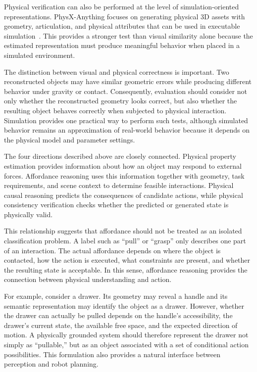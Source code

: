 \documentclass{SCIS2026}
\begin{document}
Physical verification can also be performed at the level of
simulation-oriented representations. PhysX-Anything focuses on generating
physical 3D assets with geometry, articulation, and physical attributes that
can be used in executable simulation~\cite{cao2025physxanything}. This
provides a stronger test than visual similarity alone because the estimated
representation must produce meaningful behavior when placed in a simulated
environment.

The distinction between visual and physical correctness is important. Two
reconstructed objects may have similar geometric errors while producing
different behavior under gravity or contact. Consequently, evaluation
should consider not only whether the reconstructed geometry looks correct,
but also whether the resulting object behaves correctly when subjected to
physical interaction. Simulation provides one practical way to perform such
tests, although simulated behavior remains an approximation of real-world
behavior because it depends on the physical model and parameter settings.



The four directions described above are closely connected. Physical property
estimation provides information about how an object may respond to external
forces. Affordance reasoning uses this information together with geometry,
task requirements, and scene context to determine feasible interactions.
Physical causal reasoning predicts the consequences of candidate actions,
while physical consistency verification checks whether the predicted or
generated state is physically valid.

This relationship suggests that affordance should not be treated as an
isolated classification problem. A label such as ``pull'' or ``grasp'' only
describes one part of an interaction. The actual affordance depends on where
the object is contacted, how the action is executed, what constraints are
present, and whether the resulting state is acceptable. In this sense,
affordance reasoning provides the connection between physical understanding
and action.

For example, consider a drawer. Its geometry may reveal a handle and its
semantic representation may identify the object as a drawer. However,
whether the drawer can actually be pulled depends on the handle's
accessibility, the drawer's current state, the available free space, and the
expected direction of motion. A physically grounded system should therefore
represent the drawer not simply as ``pullable,'' but as an object associated
with a set of conditional action possibilities. This formulation also
provides a natural interface between perception and robot planning.
\end{document}
